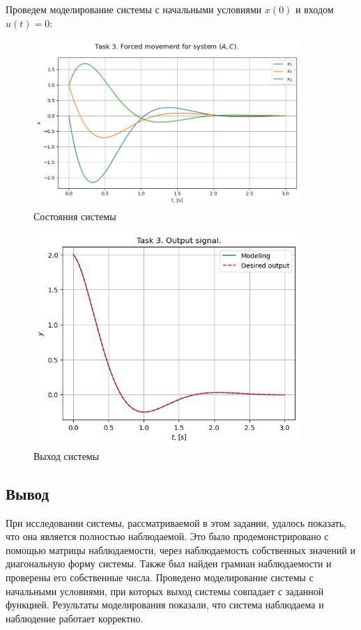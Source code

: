 Проведем моделирование системы с начальными условиями $x(0)$ и входом $u(t) = 0$: 
\begin{figure}[H]
    \centering
    \includegraphics[width=0.9\textwidth]{../plots/task_3_1.png}
    \caption{Состояния системы}
    \label{fig:task3_states}
\end{figure}

\begin{figure}[H]
    \centering
    \includegraphics[width=0.9\textwidth]{../plots/task_3_2.png}
    \caption{Выход системы}
    \label{fig:task3_output}
\end{figure}

\subsection{Вывод}
При исследовании системы, рассматриваемой в этом задании, удалось показать,
что она является полностью наблюдаемой. Это было продемонстрировано с помощью
матрицы наблюдаемости, через наблюдаемость собственных значений и диагональную
форму системы. Также был найден грамиан наблюдаемости и проверены его собственные
числа. Проведено моделирование системы с начальными условиями, при которых выход
системы совпадает с заданной функцией. Результаты моделирования показали, что
система наблюдаема и наблюдение работает корректно.